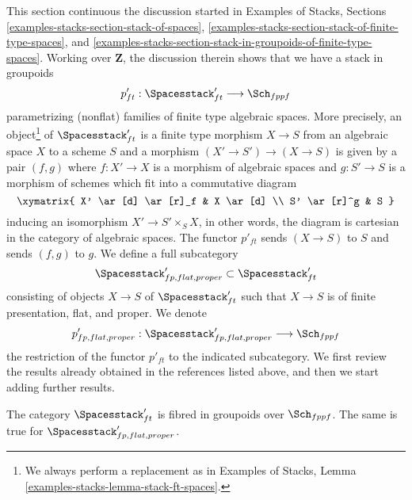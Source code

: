 \noindent
This section continuous the discussion started in
Examples of Stacks, Sections
\ref{examples-stacks-section-stack-of-spaces},
\ref{examples-stacks-section-stack-of-finite-type-spaces}, and
\ref{examples-stacks-section-stack-in-groupoids-of-finite-type-spaces}.
Working over $\mathbf{Z}$, the discussion therein shows
that we have a stack in groupoids
$$
p'_{ft} : \Spacesstack'_{ft} \longrightarrow \Sch_{fppf}
$$
parametrizing (nonflat) families of finite type algebraic spaces.
More precisely, an object\footnote{We always perform a replacement as in
Examples of Stacks, Lemma \ref{examples-stacks-lemma-stack-ft-spaces}.}
of $\Spacesstack'_{ft}$ is a finite type morphism $X \to S$
from an algebraic space $X$ to a scheme $S$ and a morphism
$(X' \to S') \to (X \to S)$ is given by a pair $(f, g)$
where $f : X' \to X$ is a morphism of algebraic spaces
and $g : S' \to S$ is a morphism of schemes
which fit into a commutative diagram
$$
\xymatrix{
X' \ar[d] \ar[r]_f & X \ar[d] \\
S' \ar[r]^g & S
}
$$
inducing an isomorphism $X' \to S' \times_S X$, in other words, the
diagram is cartesian in the category of algebraic spaces.
The functor $p'_{ft}$ sends $(X \to S)$ to $S$ and sends
$(f, g)$ to $g$. We define a full subcategory
$$
\Spacesstack'_{fp, flat, proper} \subset
\Spacesstack'_{ft}
$$
consisting of objects $X \to S$ of $\Spacesstack'_{ft}$
such that $X \to S$ is of finite presentation, flat, and proper.
We denote
$$
p'_{fp, flat, proper} :
\Spacesstack'_{fp, flat, proper}
\longrightarrow
\Sch_{fppf}
$$
the restriction of the functor $p'_{ft}$ to the indicated subcategory.
We first review the results already obtained in the references
listed above, and then we start adding further results.

\begin{lemma}
\label{lemma-spaces-fibred-in-groupoids}
The category $\Spacesstack'_{ft}$ is fibred in groupoids
over $\Sch_{fppf}$. The same is true for
$\Spacesstack'_{fp, flat, proper}$.
\end{lemma}

